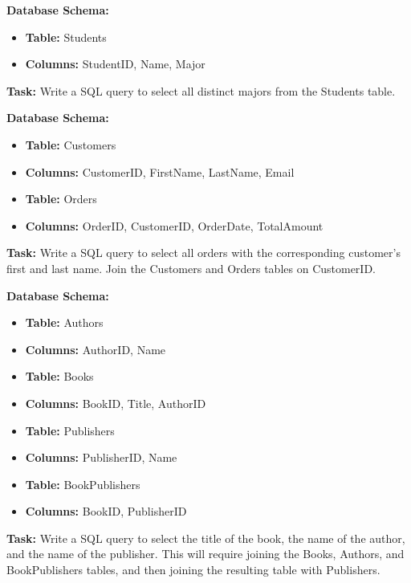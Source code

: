 \begin{exercisebox}
\noindent \textbf{Database Schema:}
\begin{itemize}
    \item \textbf{Table:} Students
    \item \textbf{Columns:} StudentID, Name, Major
\end{itemize}

\noindent \textbf{Task:} Write a SQL query to select all distinct majors from the Students table.\\
\end{exercisebox}

\begin{exercisebox}
\noindent \textbf{Database Schema:} 
\begin{itemize}
    \item \textbf{Table:} Customers
    \item \textbf{Columns:} CustomerID, FirstName, LastName, Email
    \item \textbf{Table:} Orders
    \item \textbf{Columns:} OrderID, CustomerID, OrderDate, TotalAmount
\end{itemize}

\noindent \textbf{Task:} Write a SQL query to select all orders with the corresponding customer's first and last name. Join the Customers and Orders tables on CustomerID.\\
\end{exercisebox}

\begin{exercisebox}
\noindent \textbf{Database Schema:}
\begin{itemize}
    \item \textbf{Table:} Authors
    \item \textbf{Columns:} AuthorID, Name
    \item \textbf{Table:} Books
    \item \textbf{Columns:} BookID, Title, AuthorID
    \item \textbf{Table:} Publishers
    \item \textbf{Columns:} PublisherID, Name
    \item \textbf{Table:} BookPublishers
    \item \textbf{Columns:} BookID, PublisherID
\end{itemize}

\noindent \textbf{Task:} Write a SQL query to select the title of the book, the name of the author, and the name of the publisher. This will require joining the Books, Authors, and BookPublishers tables, and then joining the resulting table with Publishers.\\
\end{exercisebox}

